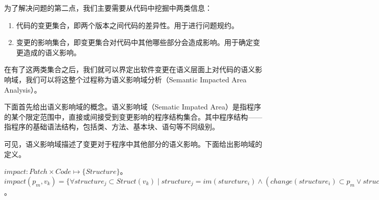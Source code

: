 
%



%
%



为了解决问题的第二点，我们主要需要从代码中挖掘中两类信息：
\begin{enumerate}
	\item 代码的变更集合，即两个版本之间代码的差异性。用于进行问题规约。
	\item 变更的影响集合，即变更集合对代码中其他哪些部分会造成影响。用于确定变更造成的语义影响。
\end{enumerate}

在有了这两类集合之后，我们就可以界定出软件变更在语义层面上对代码的语义影响域，我们可以将这整个过程称为语义影响域分析（Semantic Impacted Area Analysis）。

下面首先给出语义影响域的概念。语义影响域（Sematic Impated Area）是指程序的某个限定范围中，直接或间接受到变更影响的程序结构集合。其中程序结构——指程序的基础语法结构，包括类、方法、基本块、语句等不同级别。

%	
%
%	

可见，语义影响域描述了变更对于程序中其他部分的语义影响。下面给出影响域的定义。

\begin{definition}
	$impact: Patch \times Code \mapsto \{Structure\}$。$impact(p_m, v_k) = \{ \forall structure_j \subset Struct(v_k) \mid structure_j = im(sturcture_i) \land (change(structure_i) \subset p_m \lor structure_i \subset impact(p_m,v_k)),structure_i,structure_j \subset Struct(v_k),v_k \subset Code,p_m \subset Pat(v_k), i,j,k,m \subset \mathbb{N} \}$。
\end{definition}

